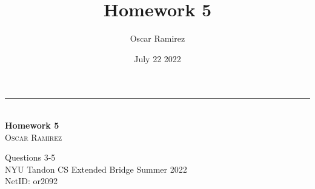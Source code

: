 \documentclass[12pt, letterpaper, twoside]{article}
\title{\textbf{Homework 5}}
\author{Oscar Ramirez}
\date{July 22 2022}
\begin{document}
\begin{titlepage}   

    \raggedleft %

    \rule{1pt}{\textheight} %
    \hspace{0.05\textwidth} %
    \parbox[b]{0.75\textwidth}{ %
        {\large\textit{}}\\[4\baselineskip]

        {\Huge\bfseries Homework 5}\\[2\baselineskip] %

        {\Large\textsc{Oscar Ramirez}} %

        \vspace{0.47\textheight} %
        {\noindent Questions 3-5}\\[0.1\baselineskip]
        {\noindent NYU Tandon CS Extended Bridge Summer 2022}\\[0.1\baselineskip]
        {\noindent NetID: or2092}\\[\baselineskip]
    }

\end{titlepage}
\newpage
\end{document}
